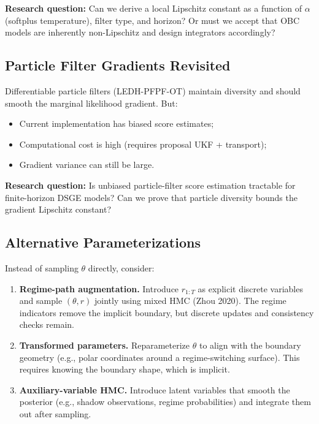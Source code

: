 \textbf{Research question:} Can we derive a local Lipschitz constant as a
function of $\alpha$ (softplus temperature), filter type, and horizon? Or must
we accept that OBC models are inherently non-Lipschitz and design
integrators accordingly?

\subsection{Particle Filter Gradients Revisited}

Differentiable particle filters (LEDH-PFPF-OT) maintain diversity and should
smooth the marginal likelihood gradient. But:
\begin{itemize}
  \item Current implementation has biased score estimates;
  \item Computational cost is high (requires proposal UKF + transport);
  \item Gradient variance can still be large.
\end{itemize}

\textbf{Research question:} Is unbiased particle-filter score estimation
tractable for finite-horizon DSGE models? Can we prove that particle diversity
bounds the gradient Lipschitz constant?

\subsection{Alternative Parameterizations}

Instead of sampling $\theta$ directly, consider:
\begin{enumerate}
  \item \textbf{Regime-path augmentation.} Introduce $r_{1:T}$ as explicit
    discrete variables and sample $(\theta, r)$ jointly using mixed HMC (Zhou
    2020). The regime indicators remove the implicit boundary, but discrete
    updates and consistency checks remain.
  \item \textbf{Transformed parameters.} Reparameterize $\theta$ to align with
    the boundary geometry (e.g., polar coordinates around a regime-switching
    surface). This requires knowing the boundary shape, which is implicit.
  \item \textbf{Auxiliary-variable HMC.} Introduce latent variables that
    smooth the posterior (e.g., shadow observations, regime probabilities) and
    integrate them out after sampling.
\end{enumerate}

